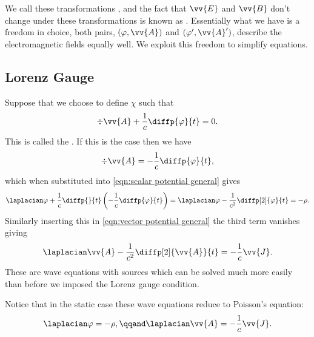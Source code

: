 We call these transformations , and the fact that \(\vv{E}\) and \(\vv{B}\) don't change under these transformations is known as .
Essentially what we have is a freedom in choice, both pairs, \((\varphi, \vv{A})\) and \((\varphi', \vv{A}')\), describe the electromagnetic fields equally well.
We exploit this freedom to simplify equations.

\subsection{Lorenz Gauge}
Suppose that we choose to define \(\chi\) such that
\begin{equation}
    \div\vv{A} + \frac{1}{c}\diffp{\varphi}{t} = 0.
\end{equation}
This is called the .
If this is the case then we have
\begin{equation}
    \div\vv{A} = -\frac{1}{c}\diffp{\varphi}{t},
\end{equation}
which when substituted into \cref{eqn:scalar potential general} gives
\begin{equation}\label{eqn:wave equation for scalar potential lorenz gauge}
    \laplacian\varphi + \frac{1}{c}\diffp{}{t}\left( -\frac{1}{c}\diffp{\varphi}{t} \right) = \laplacian\varphi - \frac{1}{c^2}\diffp[2]{\varphi}{t} = -\rho.
\end{equation}
Similarly inserting this in \cref{eqn:vector potential general} the third term vanishes giving
\begin{equation}\label{eqn:wave equation for vector potential lorenz gauge}
    \laplacian\vv{A} - \frac{1}{c^2}\diffp[2]{\vv{A}}{t} = -\frac{1}{c}\vv{J}.
\end{equation}
These are wave equations with sources which can be solved much more easily than before we imposed the Lorenz gauge condition.

Notice that in the static case these wave equations reduce to Poisson's equation:
\begin{equation}
    \laplacian\varphi = -\rho, \qqand \laplacian\vv{A} = -\frac{1}{c}\vv{J}.
\end{equation}

